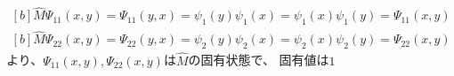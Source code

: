 \documentclass[../ap_2023.tex]{subfiles}
\begin{document}
\section{}
\subsection{}
\begin{equation}\begin{aligned}[b]
    \hat{M}\Psi_{11}(x,y)
    =\Psi_{11}(y,x)
    =\psi_1(y)\psi_1(x)
    =\psi_1(x)\psi_1(y)
    =\Psi_{11}(x,y)
\end{aligned}\end{equation}
\begin{equation}\begin{aligned}[b]
    \hat{M}\Psi_{22}(x,y)
    =\Psi_{22}(y,x)
    =\psi_2(y)\psi_2(x)
    =\psi_2(x)\psi_2(y)
    =\Psi_{22}(x,y)
\end{aligned}\end{equation}
より、\(\Psi_{11}(x,y),\Psi_{22}(x,y)\)は\(\hat{M}\)の固有状態で、
固有値は\(1\)
\end{document}
